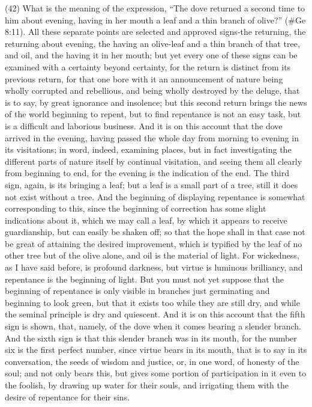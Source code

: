 (42) What is the meaning of the expression, ``The dove returned a second time to him about
evening, having in her mouth a leaf and a thin branch of olive?'' (\#Ge 8:11). All these separate
points are selected and approved signs-the returning, the returning about evening, the having an
olive-leaf and a thin branch of that tree, and oil, and the having it in her mouth; but yet every one of
these signs can be examined with a certainty beyond certainty, for the return is distinct from its
previous return, for that one bore with it an announcement of nature being wholly corrupted and
rebellious, and being wholly destroyed by the deluge, that is to say, by great ignorance and
insolence; but this second return brings the news of the world beginning to repent, but to find
repentance is not an easy task, but is a difficult and laborious business. And it is on this account
that the dove arrived in the evening, having passed the whole day from morning to evening in its
visitations; in word, indeed, examining places, but in fact investigating the different parts of nature
itself by continual visitation, and seeing them all clearly from beginning to end, for the evening is the
indication of the end. The third sign, again, is its bringing a leaf; but a leaf is a small part of a tree,
still it does not exist without a tree. And the beginning of displaying repentance is somewhat
corresponding to this, since the beginning of correction has some slight indications about it, which
we may call a leaf, by which it appears to receive guardianship, but can easily be shaken off; so
that the hope shall in that case not be great of attaining the desired improvement, which is typified
by the leaf of no other tree but of the olive alone, and oil is the material of light. For wickedness, as
I have said before, is profound darkness, but virtue is luminous brilliancy, and repentance is the
beginning of light. But you must not yet suppose that the beginning of repentance is only visible in
branches just germinating and beginning to look green, but that it exists too while they are still dry,
and while the seminal principle is dry and quiescent. And it is on this account that the fifth sign is
shown, that, namely, of the dove when it comes bearing a slender branch. And the sixth sign is that
this slender branch was in its mouth, for the number six is the first perfect number, since virtue
bears in its mouth, that is to say in its conversation, the seeds of wisdom and justice, or, in one
word, of honesty of the soul; and not only bears this, but gives some portion of participation in it
even to the foolish, by drawing up water for their souls, and irrigating them with the desire of
repentance for their sins.

